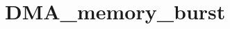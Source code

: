 \hypertarget{group___d_m_a__memory__burst}{\section{D\-M\-A\-\_\-memory\-\_\-burst}
\label{group___d_m_a__memory__burst}
}
